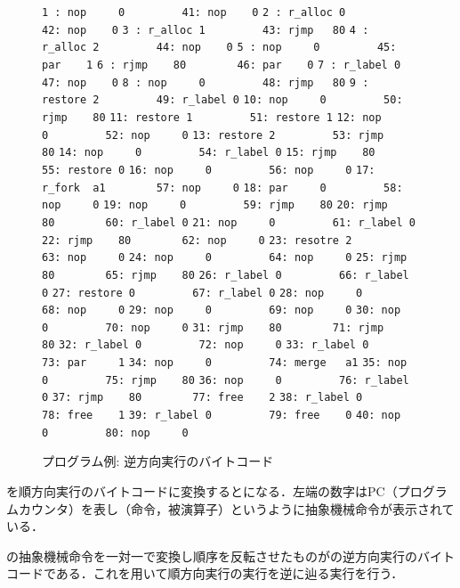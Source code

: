 \documentclass[submit,PRO]{ipsj}
\def\|{\verb|}
\begin{document}
\begin{figure}[tb]
\vbox{
\hbox{\|1 : nop     0         41: nop    0|}
\hbox{\|2 : r_alloc 0         42: nop    0|}
\hbox{\|3 : r_alloc 1         43: rjmp   80|}
\hbox{\|4 : r_alloc 2         44: nop    0|}
\hbox{\|5 : nop     0         45: par    1|}
\hbox{\|6 : rjmp    80        46: par    0|}
\hbox{\|7 : r_label 0         47: nop    0|}
\hbox{\|8 : nop     0         48: rjmp   80|}
\hbox{\|9 : restore 2         49: r_label 0|}
\hbox{\|10: nop     0         50: rjmp    80|}
\hbox{\|11: restore 1         51: restore 1|}
\hbox{\|12: nop     0         52: nop     0|}
\hbox{\|13: restore 2         53: rjmp    80|}
\hbox{\|14: nop     0         54: r_label 0|}
\hbox{\|15: rjmp    80        55: restore 0|}
\hbox{\|16: nop     0         56: nop     0|}
\hbox{\|17: r_fork  a1        57: nop     0|}
\hbox{\|18: par     0         58: nop     0|}
\hbox{\|19: nop     0         59: rjmp    80|}
\hbox{\|20: rjmp    80        60: r_label 0|}
\hbox{\|21: nop     0         61: r_label 0|}
\hbox{\|22: rjmp    80        62: nop     0|}
\hbox{\|23: resotre 2         63: nop     0|}
\hbox{\|24: nop     0         64: nop     0|}
\hbox{\|25: rjmp    80        65: rjmp    80|}
\hbox{\|26: r_label 0         66: r_label 0|}
\hbox{\|27: restore 0         67: r_label 0|}
\hbox{\|28: nop     0         68: nop     0|}
\hbox{\|29: nop     0         69: nop     0|}
\hbox{\|30: nop     0         70: nop     0|}
\hbox{\|31: rjmp    80        71: rjmp    80|}
\hbox{\|32: r_label 0         72: nop     0|}
\hbox{\|33: r_label 0         73: par     1|}
\hbox{\|34: nop     0         74: merge   a1|} 
\hbox{\|35: nop     0         75: rjmp    80|}
\hbox{\|36: nop     0         76: r_label 0|}
\hbox{\|37: rjmp    80        77: free    2|}
\hbox{\|38: r_label 0         78: free    1|}
\hbox{\|39: r_label 0         79: free    0|}
\hbox{\|40: nop     0         80: nop     0|}
}
\centerline{}
\caption{プログラム例: 逆方向実行のバイトコード}
\label{fig:backward}
\end{figure}



を順方向実行のバイトコードに変換するとになる．左端の数字はPC（プログラムカウンタ）を表し（命令，被演算子）というように抽象機械命令が表示されている．

の抽象機械命令を一対一で変換し順序を反転させたものがの逆方向実行のバイトコードである．これを用いて順方向実行の実行を逆に辿る実行を行う．
\end{document}
